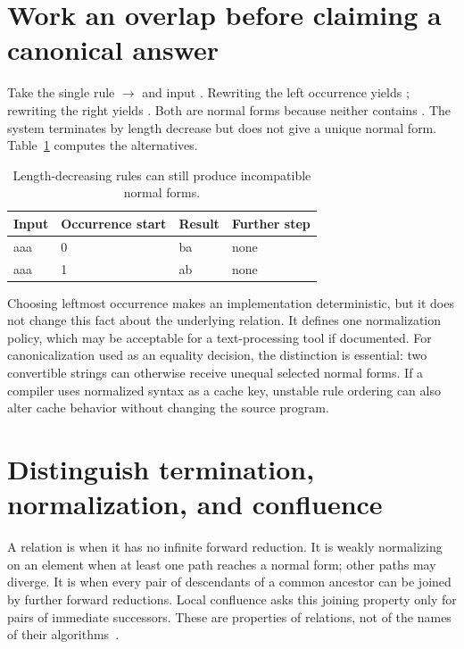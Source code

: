 \section{Work an overlap before claiming a canonical answer}
\label{sec:ch81-overlap}
Take the single rule $\to$ and input .
Rewriting the left occurrence yields ; rewriting the right yields .
Both are normal forms because neither contains .
The system terminates by length decrease but does not give a unique normal form.
Table~\ref{tab:ch81-overlap} computes the alternatives.

\begin{table}[htbp]
\caption{Length-decreasing rules can still produce incompatible normal forms.}
\label{tab:ch81-overlap}
\centering
\begin{tabular}{llll}
\toprule
Input & Occurrence start & Result & Further step \\
\midrule
aaa & 0 & ba & none \\
aaa & 1 & ab & none \\
\bottomrule
\end{tabular}
\end{table}

Choosing leftmost occurrence makes an implementation deterministic, but it does not change this fact about the underlying relation.
It defines one normalization policy, which may be acceptable for a text-processing tool if documented.
For canonicalization used as an equality decision, the distinction is essential: two convertible strings can otherwise receive unequal selected normal forms.
If a compiler uses normalized syntax as a cache key, unstable rule ordering can also alter cache behavior without changing the source program.

\section{Distinguish termination, normalization, and confluence}
\label{sec:ch81-properties}
A relation is  when it has no infinite forward reduction.
It is weakly normalizing on an element when at least one path reaches a normal form; other paths may diverge.
It is  when every pair of descendants of a common ancestor can be joined by further forward reductions.
Local confluence asks this joining property only for pairs of immediate successors.
These are properties of relations, not of the names of their algorithms~\cite{ohlebusch-2002-rewriting}.

